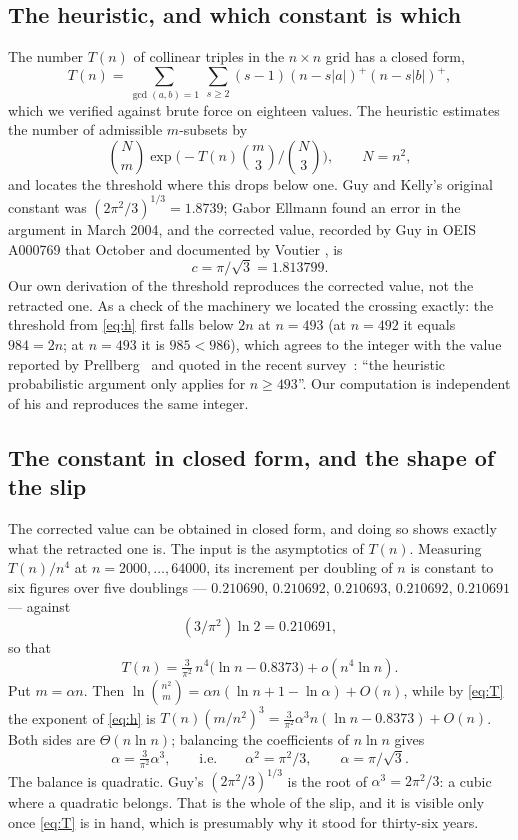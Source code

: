 \documentclass[11pt,a4paper]{article}
\begin{document}
\subsection{The heuristic, and which constant is which}\label{s:constants}
The number $T(n)$ of collinear triples in the $n\times n$ grid has a closed form,
\[T(n)=\sum_{\gcd(a,b)=1}\ \sum_{s\ge2}(s-1)(n-s|a|)^{+}(n-s|b|)^{+},\]
which we verified against brute force on eighteen values.  The heuristic estimates the number of
admissible $m$-subsets by
\begin{equation}\label{eq:h}
\binom{N}{m}\exp\!\Big(-T(n)\binom{m}{3}\Big/\binom{N}{3}\Big),\qquad N=n^2,
\end{equation}
and locates the threshold where this drops below one.  Guy and Kelly's original constant was
$(2\pi^2/3)^{1/3}=1.8739$; Gabor Ellmann found an error in the argument in March 2004, and the
corrected value, recorded by Guy in OEIS A000769 that October and documented by Voutier
\cite{Voutier}, is
\[c=\pi/\sqrt3=1.813799.\]
Our own derivation of the threshold reproduces the corrected value, not the retracted one.  As a
check of the machinery we located the crossing exactly: the threshold from \eqref{eq:h} first falls
below $2n$ at $n=493$ (at $n=492$ it equals $984=2n$; at $n=493$ it is $985<986$), which agrees to the
integer with the value reported by Prellberg~\cite{Prellberg} and quoted in the recent
survey~\cite{Survey}: ``the heuristic probabilistic argument only applies for $n\ge493$''.
Our computation is independent of his and reproduces the same integer.

\subsection{The constant in closed form, and the shape of the slip}\label{s:closedform}
The corrected value can be obtained in closed form, and doing so shows exactly what the retracted
one is.  The input is the asymptotics of $T(n)$.  Measuring $T(n)/n^4$ at $n=2000,\dots,64000$, its
increment per doubling of $n$ is constant to six figures over five doublings ---
$0.210690$, $0.210692$, $0.210693$, $0.210692$, $0.210691$ --- against
\[(3/\pi^2)\ln 2=0.210691,\]
so that
\begin{equation}\label{eq:T}
T(n)=\tfrac{3}{\pi^2}\,n^4\big(\ln n-0.8373\big)+o(n^4\ln n).
\end{equation}
Put $m=\alpha n$.  Then $\ln\binom{n^2}{m}=\alpha n(\ln n+1-\ln\alpha)+O(n)$, while by \eqref{eq:T}
the exponent of \eqref{eq:h} is $T(n)(m/n^2)^3=\tfrac{3}{\pi^2}\alpha^3 n(\ln n-0.8373)+O(n)$.
Both sides are $\Theta(n\ln n)$; balancing the coefficients of $n\ln n$ gives
\[\alpha=\tfrac{3}{\pi^2}\alpha^3,\qquad\text{i.e.}\qquad \alpha^2=\pi^2/3,\qquad \alpha=\pi/\sqrt3 .\]
The balance is quadratic.  Guy's $(2\pi^2/3)^{1/3}$ is the root of $\alpha^3=2\pi^2/3$: a cubic
where a quadratic belongs.  That is the whole of the slip, and it is visible only once
\eqref{eq:T} is in hand, which is presumably why it stood for thirty-six years.
\end{document}
